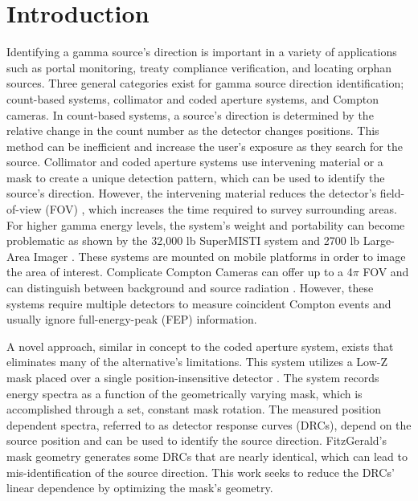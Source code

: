 \documentclass[3p,times]{elsarticle}
\begin{document}
\section{Introduction}
\label{intro}
Identifying a gamma source's direction is important in a variety of applications such as portal monitoring, treaty compliance verification, and locating orphan sources.  
Three general categories exist for gamma source direction identification; count-based systems, collimator and coded aperture systems, and Compton cameras.
In count-based systems, a source's direction is determined by the relative change in the count number as the detector changes positions.  This method can 
be inefficient and increase the user's exposure as they search for the source.  Collimator and coded aperture systems 
use intervening material or a mask to create a unique detection pattern, which can be
used to identify the source's direction.  However, the intervening material reduces
the detector's field-of-view (FOV) \cite{Vetter06}, which increases the time required to survey surrounding areas.  For higher gamma energy levels, the system's weight 
and portability can become problematic as shown by the 32,000 lb SuperMISTI system \cite{Hutcheson14} and 2700 lb Large-Area Imager \cite{Ziock06}.  
These systems are mounted on mobile platforms in order to image
the area of interest.  Complicate Compton Cameras can offer up to a 4$\pi$ FOV 
\cite{Wahl11} and can distinguish between background and source radiation \cite{Vetter06, Phillips95}.  However,
these systems require multiple detectors to measure coincident Compton events and usually ignore full-energy-peak (FEP) information.  

A novel approach, similar in concept to the coded aperture system, exists that eliminates many of the alternative's limitations.
This system utilizes a Low-Z mask placed over a single position-insensitive detector \cite{FitzGerald2015}.  
The system records energy spectra as a function of the geometrically varying mask, which is accomplished through a set, constant mask rotation. 
The measured position dependent spectra, referred to as detector response curves (DRCs), depend on the source position and can be used to identify the source direction.  FitzGerald's mask  geometry \cite{FitzGerald2015} generates some DRCs that are nearly identical, which can lead to mis-identification of the source direction.  
This work seeks to reduce the DRCs' linear dependence by optimizing the mask's geometry.
\end{document}

